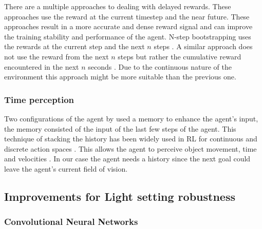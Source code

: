 There are a multiple approaches to dealing with delayed rewards. These approaches use the reward at the current timestep and the near future. These approaches result in a more accurate and dense reward signal and can improve the training stability and performance of the agent.
N-step bootstrapping uses the rewards at the current step and the next \(n\) steps \autocite{nstepbootstrapping}.
A similar approach does not use the reward from the next \(n\) steps but rather the cumulative reward encountered in the next \(n\) seconds \autocite{trackmania}. Due to the continuous nature of the environment this approach might be more suitable than the previous one.


\subsubsection{Time perception}

Two configurations of the agent by \autocite{maximilian} used a memory to enhance the agent's input, the memory consisted of the input of the last few steps of the agent. This technique of stacking the history has been widely used in RL for continuous \autocite{atari} and discrete action spaces \autocite{alphago}. This allows the agent to perceive object movement, time and velocities \autocite{atari}.
In our case the agent needs a history since the next goal could leave the agent's current field of vision.



\subsection{Improvements for Light setting robustness} \label{light_setting_robustness}

\subsubsection{Convolutional Neural Networks}

